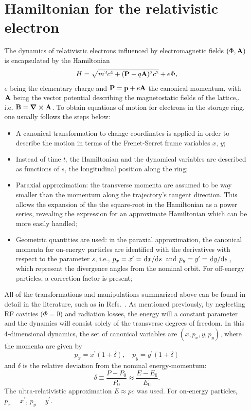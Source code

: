 \section{Hamiltonian for the relativistic electron}
The dynamics of relativistic electrons influenced by electromagnetic fields $(\Phi, \vb{A})$ is encapsulated by the Hamiltonian \cite{landau_classical_1975}
    \begin{equation*}
        H=\sqrt{m^2c^4+(\vb{P}-q\vb{A})^2c^2}+e\Phi,
    \end{equation*}
 $e$ being the elementary charge and $\vb{P}=\vb{p}+e\vb{A}$ the canonical momentum, with $\vb{A}$ being the vector potential describing the magnetostatic fields of the lattice,. i.e. $\vb{B}=\curl \vb{A}$. To obtain equations of motion for electrons in the storage ring, one usually follows the steps below:
 \begin{itemize}
    \item A canonical transformation to change coordinates is applied in order to describe the motion in terms of the Frenet-Serret frame variables $x$, $y$;
    \item Instead of time $t$, the Hamiltonian and the dynamical variables are described as functions of $s$, the longitudinal position along the ring;
    \item Paraxial approximation: the transverse momenta are assumed to be way smaller than the momentum along the trajectory's tangent direction. This allows the expansion of the the square-root in the Hamiltonian as a power series, revealing the expression for an approximate Hamiltonian which can be more easily handled;
    \item Geometric quantities are used: in the paraxial approximation, the canonical momenta for on-energy particles are identified with the derivatives with respect to the parameter $s$, i.e., $p_x = x^\prime = \dv*{x}{s}$ and $p_y = y^\prime = \dv*{y}{s}$, which represent the divergence angles from the nominal orbit. For off-energy particles, a correction factor is present;
 \end{itemize}
 All of the transformations and manipulations summarized above can be found in detail in the literature, such as in Refs.~\cite{lee_accelerator_2004, wiedemann_particle_2015,  wolski_beam_2014}. As mentioned previously, by neglecting RF cavities ($\Phi=0$) and radiation losses, the energy will a constant parameter and the dynamics will consist solely of the transverse degrees of freedom.  In this 4-dimensional dynamics, the set of canonical variables are $(x,p_{x},y , p_{y})$, where the momenta are given by
\begin{equation} p_{x}= x^\prime(1+\delta),\quad p_{y}=y^\prime (1+\delta)\end{equation}
and $\delta$ is the relative deviation from the nominal energy-momentum:
\begin{equation}
    \delta \equiv \frac{P-P_{0}}{P_{0}}\approx\frac{E-E_0}{E_0}.
\end{equation}
The ultra-relativistic approximation $E\approx pc$ was used. For on-energy particles, $p_x = x^\prime$, $p_y = y^\prime$.

